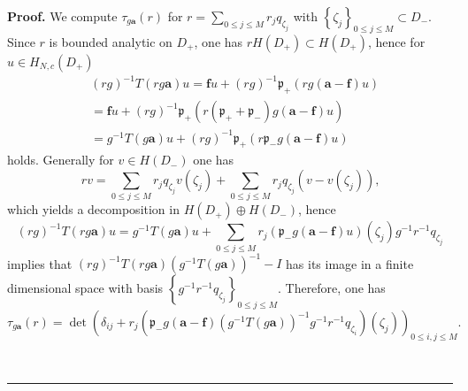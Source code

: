 \documentclass[a4paper]{article}%
\newenvironment{proof}[1][Proof]{\noindent\textbf{#1.} }{\ \rule{0.5em}{0.5em}}
\begin{document}
\begin{proof}
We compute $\tau_{g\boldsymbol{a}}\left(  r\right)  $ for $r=\sum_{0\leq j\leq
M}r_{j}q_{\zeta_{j}}$ with $\left\{  \zeta_{j}\right\}  _{0\leq j\leq
M}\subset D_{-}$. Since $r$ is bounded analytic on $D_{+}$, one has $rH\left(
D_{+}\right)  \subset H\left(  D_{+}\right)  $, hence for $u\in H_{N,c}\left(
D_{+}\right)  $
\begin{align*}
&  \left(  rg\right)  ^{-1}T\left(  rg\boldsymbol{a}\right)  u=\boldsymbol{f}%
u+\left(  rg\right)  ^{-1}\mathfrak{p}_{+}\left(  rg\left(  \boldsymbol{a}%
-\boldsymbol{f}\right)  u\right) \\
&  =\boldsymbol{f}u+\left(  rg\right)  ^{-1}\mathfrak{p}_{+}\left(  r\left(
\mathfrak{p}_{+}+\mathfrak{p}_{-}\right)  g\left(  \boldsymbol{a}%
-\boldsymbol{f}\right)  u\right) \\
&  =g^{-1}T\left(  g\boldsymbol{a}\right)  u+\left(  rg\right)  ^{-1}%
\mathfrak{p}_{+}\left(  r\mathfrak{p}_{-}g\left(  \boldsymbol{a}%
-\boldsymbol{f}\right)  u\right)
\end{align*}
holds. Generally for $v\in H\left(  D_{-}\right)  $ one has%
\[
rv=\sum_{0\leq j\leq M}r_{j}q_{\zeta_{j}}v\left(  \zeta_{j}\right)
+\sum_{0\leq j\leq M}r_{j}q_{\zeta_{j}}\left(  v-v\left(  \zeta_{j}\right)
\right)  \text{,}%
\]
which yields a decomposition in $H\left(  D_{+}\right)  \oplus H\left(
D_{-}\right)  $, hence%
\[
\left(  rg\right)  ^{-1}T\left(  rg\boldsymbol{a}\right)  u=g^{-1}T\left(
g\boldsymbol{a}\right)  u+\sum_{0\leq j\leq M}r_{j}\left(  \mathfrak{p}%
_{-}g\left(  \boldsymbol{a}-\boldsymbol{f}\right)  u\right)  \left(  \zeta
_{j}\right)  g^{-1}r^{-1}q_{\zeta_{j}}%
\]
implies that $\left(  rg\right)  ^{-1}T\left(  rg\boldsymbol{a}\right)
\left(  g^{-1}T\left(  g\boldsymbol{a}\right)  \right)  ^{-1}-I$ has its image
in a finite dimensional space with basis $\left\{  g^{-1}r^{-1}q_{\zeta_{j}%
}\right\}  _{0\leq j\leq M}$. Therefore, one has
\begin{equation}
\tau_{g\boldsymbol{a}}\left(  r\right)  =\det\left(  \delta_{ij}+r_{j}\left(
\mathfrak{p}_{-}g\left(  \boldsymbol{a}-\boldsymbol{f}\right)  \left(
g^{-1}T\left(  g\boldsymbol{a}\right)  \right)  ^{-1}g^{-1}r^{-1}q_{\zeta_{i}%
}\right)  \left(  \zeta_{j}\right)  \right)  _{0\leq i,j\leq M}\text{.}
\label{2-23}%
\end{equation}



\end{proof}
\end{document}

